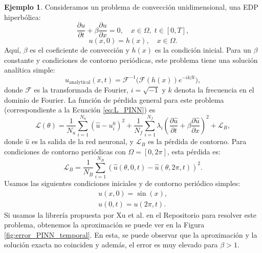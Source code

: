 \documentclass[a4paper,11pt,spanish, twoside, leqno]{tfg-uam}
\theoremstyle{definition}
\newtheorem{exmp}[teor]{Ejemplo}
\begin{document}
\begin{mdframed}
    \begin{exmp}
        Consideramos un problema de convección unidimensional, una EDP hiperbólica:
        \begin{equation*}
            \frac{\partial u}{\partial t} + \beta \frac{\partial u}{\partial x} = 0, \quad x \in \Omega, \; t \in [0, T],
        \end{equation*}
        \begin{equation*}
            u(x, 0) = h(x), \quad x \in \Omega.
        \end{equation*}
        Aquí, $\beta$ es el coeficiente de convección y $h(x)$ es la condición inicial. Para un $\beta$ constante y condiciones de contorno periódicas, este problema tiene una solución analítica simple:
        \begin{equation*}
            u_{\text{analytical}}(x, t) = \mathcal{F}^{-1} \big( \mathcal{F}(h(x)) e^{-i k \beta t} \big),
        \end{equation*}
        donde $\mathcal{F}$ es la transformada de Fourier, $i = \sqrt{-1}$ y $k$ denota la frecuencia en el dominio de Fourier. La función de pérdida general para este problema (correspondiente a la Ecuación \eqref{eq:L_PINN}) es
        \begin{equation*}
            \mathcal{L}(\theta) = \frac{1}{N_u} \sum_{i=1}^{N_u} \left( \hat{u} - u^0_i \right)^2 
            + \frac{1}{N_f} \sum_{i=1}^{N_f} \lambda_i \left( \frac{\partial \hat{u}}{\partial t} + \beta \frac{\partial \hat{u}}{\partial x} \right)^2 + \mathcal{L}_B,
        \end{equation*}
        donde $\hat{u}$ es la salida de la red neuronal, y $\mathcal{L}_B$ es la pérdida de contorno. Para condiciones de contorno periódicas con $\Omega = [0, 2\pi]$, esta pérdida es:
        \begin{equation*}
            \mathcal{L}_B = \frac{1}{N_B} \sum_{i=1}^{N_B} \left( \hat{u}(\theta, 0, t) - \hat{u}(\theta, 2\pi, t) \right)^2.
        \end{equation*}
        Usamos las siguientes condiciones iniciales y de contorno periódico simples:
        \begin{align*}
            u(x, 0) = \sin(x),\\
            u(0, t) = u(2\pi, t).
        \end{align*}
        Si usamos la librería propuesta por Xu et al. en el Repositorio \cite{c2021failure} para resolver este problema, obtenemos la aproximación se puede ver en la Figura \ref{fig:error_PINN_temporal}. En esta, se puede observar que la aproximación y la solución exacta no coinciden y además, el error es muy elevado para $\beta > 1$.

\end{exmp}
\end{mdframed}
\end{document}
